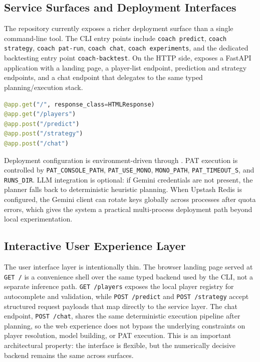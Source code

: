 \documentclass{article}
\begin{document}
\subsection*{Service Surfaces and Deployment Interfaces}
The repository currently exposes a richer deployment surface than a single command-line tool. The CLI entry points include \texttt{coach predict}, \texttt{coach strategy}, \texttt{coach pat-run}, \texttt{coach chat}, \texttt{coach experiments}, and the dedicated backtesting entry point \texttt{coach-backtest}. On the HTTP side,  exposes a FastAPI application with a landing page, a player-list endpoint, prediction and strategy endpoints, and a chat endpoint that delegates to the same typed planning/execution stack.

\begin{lstlisting}[style=code,language=Python,caption={Current FastAPI route surface in \texttt{coach/ui/app.py}.}]
@app.get("/", response_class=HTMLResponse)
@app.get("/players")
@app.post("/predict")
@app.post("/strategy")
@app.post("/chat")
\end{lstlisting}

Deployment configuration is environment-driven through . PAT execution is controlled by \texttt{PAT\_CONSOLE\_PATH}, \texttt{PAT\_USE\_MONO}, \texttt{MONO\_PATH}, \texttt{PAT\_TIMEOUT\_S}, and \texttt{RUNS\_DIR}. LLM integration is optional: if Gemini credentials are not present, the planner falls back to deterministic heuristic planning. When Upstash Redis is configured, the Gemini client can rotate keys globally across processes after quota errors, which gives the system a practical multi-process deployment path beyond local experimentation.

\subsection*{Interactive User Experience Layer}
The user interface layer is intentionally thin. The browser landing page served at \texttt{GET /} is a convenience shell over the same typed backend used by the CLI, not a separate inference path. \texttt{GET /players} exposes the local player registry for autocomplete and validation, while \texttt{POST /predict} and \texttt{POST /strategy} accept structured request payloads that map directly to the service layer. The chat endpoint, \texttt{POST /chat}, shares the same deterministic execution pipeline after planning, so the web experience does not bypass the underlying constraints on player resolution, model building, or PAT execution. This is an important architectural property: the interface is flexible, but the numerically decisive backend remains the same across surfaces.
\end{document}
